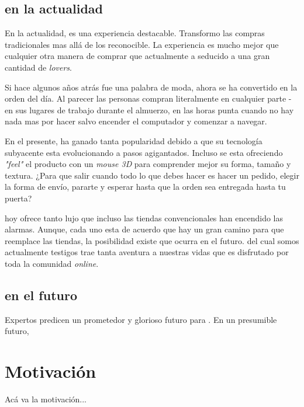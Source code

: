 \subsection{\ecommerce en la actualidad}

En la actualidad, \ecommerce es una experiencia destacable. Transformo las compras tradicionales mas allá de los reconocible. La experiencia es mucho mejor que cualquier otra manera de comprar que actualmente a seducido a una gran cantidad de \ecommerce \textit{lovers}.

Si hace algunos años atrás \ecommerce fue una palabra de moda, ahora se ha convertido en la orden del día. Al parecer las personas compran literalmente en cualquier parte - en sus lugares de trabajo durante el almuerzo, en las horas punta cuando no hay nada mas por hacer salvo encender el computador y comenzar a navegar.

En el presente, \ecommerce ha ganado tanta popularidad debido a que su tecnología subyacente esta evolucionando a pasos agigantados. Incluso se esta ofreciendo \textit{"feel"} el producto con un \textit{mouse 3D} para comprender mejor su forma, tamaño y textura. ¿Para que salir cuando todo lo que debes hacer es hacer un pedido, elegir la forma de envío, pararte y esperar hasta que la orden sea entregada hasta tu puerta?

\ecommerce hoy ofrece tanto lujo que incluso las tiendas convencionales han encendido las alarmas. Aunque, cada uno esta de acuerdo que hay un gran camino para que \ecommerce reemplace las tiendas, la posibilidad existe que ocurra en el futuro. \ecommerce del cual somos actualmente testigos trae tanta aventura a nuestras vidas que es disfrutado por toda la comunidad \textit{online}.


\subsection{\ecommerce en el futuro}


Expertos predicen un prometedor y glorioso futuro para \ecommerce. En un presumible futuro, \ecommerce 


\section{Motivación}\label{cap:intro:motivacion}

Acá va la motivación...

